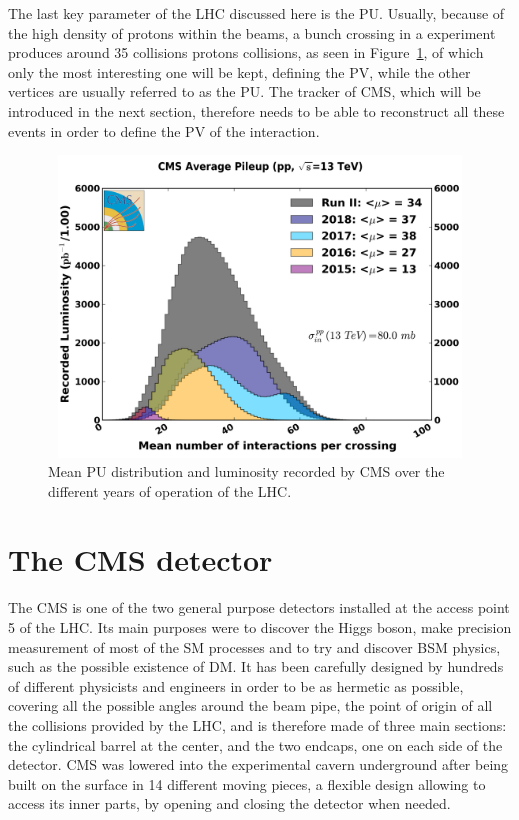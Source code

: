 \documentclass[a4paper, 10pt, openright]{report}
\begin{document}
The last key parameter of the \ac{LHC} discussed here is the \acf{PU}. Usually, because of the high density of protons within the beams, a bunch crossing in a experiment produces around 35 collisions protons collisions, as seen in Figure~\ref{fig:PU}, of which only the most interesting one will be kept, defining the \ac{PV}, while the other vertices are usually referred to as the \ac{PU}. The tracker of \ac{CMS}, which will be introduced in the next section, therefore needs to be able to reconstruct all these events in order to define the \ac{PV} of the interaction. 

\begin{figure}[htbp]
\begin{center}
\includegraphics[width=12cm, height=8cm]{figs/PUSUmmary.png}
\caption{Mean \ac{PU} distribution and luminosity recorded by \ac{CMS} over the different years of operation of the \ac{LHC}.}
\label{fig:PU}
\end{center}
\end{figure}

\section{The \ac{CMS} detector} \label{section:CMS}

The \acf{CMS} is one of the two general purpose detectors installed at the access point 5 of the \ac{LHC}. Its main purposes were to discover the Higgs boson, make precision measurement of most of the \ac{SM} processes and to try and discover \ac{BSM} physics, such as the possible existence of \ac{DM}. It has been carefully designed by hundreds of different physicists and engineers in order to be as hermetic as possible, covering all the possible angles around the beam pipe, the point of origin of all the collisions provided by the \ac{LHC}, and is therefore made of three main sections: the cylindrical barrel at the center, and the two endcaps, one on each side of the detector. \ac{CMS} was lowered into the experimental cavern underground after being built on the surface in 14 different moving pieces, a flexible design allowing to access its inner parts, by opening and closing the detector when needed.
\end{document}
